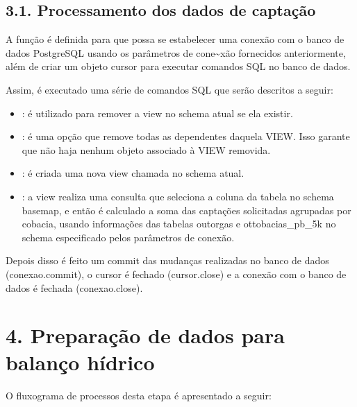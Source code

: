 \documentclass[a4paper,10pt,brazil]{sphinxmanual}
\begin{document}
\subsection{3.1. Processamento dos dados de captação}
\label{\detokenize{3processamentoCaptacao:processamento-dos-dados-de-captacao}}
\sphinxAtStartPar
A função  é definida para que possa se estabelecer uma conexão com o banco de dados PostgreSQL usando os parâmetros de cone\textasciitilde{}xão fornecidos anteriormente, além de criar um objeto cursor para executar comandos SQL no banco de dados.

\sphinxAtStartPar
Assim, é executado uma série de comandos SQL que serão descritos a seguir:
\begin{itemize}
\item {} 
\sphinxAtStartPar
{}: é utilizado para remover a view  no schema atual se ela existir.

\item {} 
\sphinxAtStartPar
{}: é uma opção que remove todas as dependentes daquela VIEW. Isso garante que não haja nenhum objeto associado à VIEW removida.

\item {} 
\sphinxAtStartPar
{}: é criada uma nova view chamada  no schema atual.

\item {} 
\sphinxAtStartPar
{}: a view realiza uma consulta que seleciona a coluna  da tabela  no schema basemap, e então é calculado a soma das captações solicitadas agrupadas por cobacia, usando informações das tabelas outorgas e ottobacias\_pb\_5k no schema especificado pelos parâmetros de conexão.

\end{itemize}

\sphinxAtStartPar
Depois disso é feito um commit das mudanças realizadas no banco de dados (conexao.commit), o cursor é fechado (cursor.close) e a conexão com o banco de dados é fechada (conexao.close).

\sphinxstepscope


\section{4. Preparação de dados para balanço hídrico}
\label{\detokenize{4preparacaoDadosBalanco:preparacao-de-dados-para-balanco-hidrico}}\label{\detokenize{4preparacaoDadosBalanco::doc}}
\sphinxAtStartPar
O fluxograma de processos desta etapa é apresentado a seguir:
\end{document}

